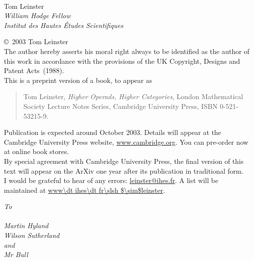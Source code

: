 \begin{titlepage}
\thispagestyle{empty}

{\centering

\vspace*{20mm}
{}\\
\vspace*{20mm}
{\huge Tom Leinster}\\
\vspace*{12mm}
{\large\it William Hodge Fellow}\\
{\large\it Institut des Hautes \'Etudes Scientifiques}\\
}

\clearpage
\thispagestyle{empty}


\noindent
\copyright\ 2003 Tom Leinster
\medskip\noindent\\
The author hereby asserts his moral right always to be identified as the
author of this work in accordance with the provisions of the UK Copyright,
Designs and Patent Acts~(1988).\\

\bigskip\noindent
This is a preprint version of a book, to appear as
%
\begin{quote}
Tom Leinster, \textit{Higher Operads, Higher Categories}, London
Mathematical Society Lecture Notes Series, Cambridge University Press, ISBN
0-521-53215-9. 
\end{quote}
%
Publication is expected around October 2003.  Details will appear at the
Cambridge University Press website, \url{www.cambridge.org}.  You can
pre-order now at online book stores.
\medskip\noindent\\
By special agreement with Cambridge University Press, the final version of
this text will appear on the ArXiv one year after its publication in
traditional form.\\

\bigskip\noindent
I would be grateful to hear of any errors: \url{leinster@ihes.fr}.  A list
will be maintained at \url{www\dt ihes\dt fr\slsh $\sim$leinster}.  



\clearpage
\thispagestyle{empty}


\vspace*{30mm}
\centering\large
\itshape
To\\
\ \\
Martin Hyland\\
Wilson Sutherland\\
and\\
Mr Bull\\


\clearpage
\thispagestyle{empty}
\ 

\end{titlepage}





